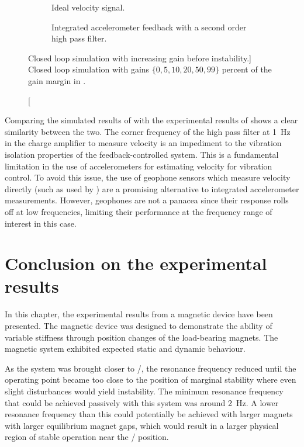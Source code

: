 \documentclass[11pt,a4paper]{memoir}
\begin{document}
\begin{figure}[!htbp]
  \begin{wide}
  \begin{subfigure}
    \caption{Ideal velocity signal.}
  \end{subfigure}
  \hfil
  \begin{subfigure}
    \caption{Integrated accelerometer feedback with a second order high pass filter.}
  \end{subfigure}
  \end{wide}
  \caption
  [Closed loop simulation with increasing gain before instability.]
  {Closed loop simulation with gains $\{0, 5, 10, 20, 50, 99\}$ percent of the gain margin in .}
\end{figure}

Comparing the simulated results of  with the experimental results of  shows a clear similarity between the two.
The corner frequency of the high pass filter at \SI{1}{Hz} in the
charge amplifier to measure velocity is an impediment to the vibration
isolation properties of the feedback-controlled system.
This is a fundamental limitation in the use of accelerometers for estimating velocity for vibration control.
To avoid this issue, the use of geophone sensors which measure velocity directly (such as used by \textcite{hong2010-rsi}) are a promising alternative to integrated accelerometer measurements.
However, geophones are not a panacea since their response rolls off at low frequencies, limiting their performance at the frequency range of interest in this case.

\section{Conclusion on the experimental results}

In this chapter, the experimental results from a magnetic device have been presented.
The magnetic device was designed to demonstrate the ability of variable stiffness through position changes of the load-bearing magnets.
The magnetic system exhibited expected static and dynamic behaviour.

As the system was brought closer to \qzs/, the resonance frequency reduced until the operating point became too close to the position of marginal stability where even slight disturbances would yield instability.
The minimum resonance frequency that could be achieved passively with this system was around \SI{2}{Hz}.
A lower resonance frequency than this could potentially be achieved with larger magnets with larger equilibrium magnet gaps, which would result in a larger physical region of stable operation near the \qzs/ position.
\end{document}
